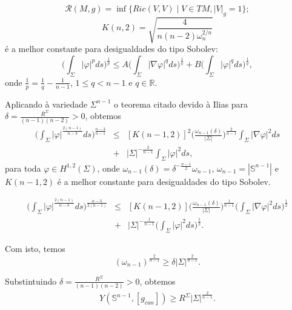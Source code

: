 \documentclass[blue]{beamer}
\begin{document}

\begin{frame}
\begin{block}{}
	$$	\label{infric}\mathcal{R}(M, g) = \inf\{Ric(V, V) \;|\; V\in TM, |V|_{g}=1\};$$
	$$K(n,2)= \sqrt{\frac{4}{n(n-2)\omega_{n}^{2/n}}}$$ é a melhor constante para desigualdades do tipo Sobolev:
	\begin{equation}\label{sob1}
	\Big(\int_{\Sigma} |\varphi|^{p} ds\Big)^{\frac{1}{p}}\leq A \Big(\int_{\Sigma}|\nabla \varphi|^{q} ds\Big)^{\frac{1}{q}} + B\Big(\int_{\Sigma} |\varphi|^{q} ds\Big)^{\frac{1}{q}},
	\end{equation}onde $\frac{1}{p}=\frac{1}{q}-\frac{1}{n-1}$, $1\leq q <n-1$ e $q\in\mathbb{R}.$
\end{block}
\end{frame}


\begin{frame}
Aplicando à variedade $\Sigma^{n-1}$ o teorema citado devido à Ilias para  $\delta = \frac{R^{\Sigma}}{(n-1)(n-2)}>0$, obtemos
\begin{eqnarray}
\nonumber\Big(\int_{\Sigma} |\varphi|^{\frac{2(n-1)}{n-3}} ds\Big)^{\frac{n-3}{n-1}}&\leq& [K(n-1,2)]^2 \Big(\frac{\omega_{n-1}(\delta)}{|\Sigma|}\Big)^{\frac{2}{n-1}} \int_{\Sigma}|\nabla \varphi|^2 ds \\
\nonumber &+& |\Sigma|^{-\frac{2}{n-1}}\int_{\Sigma} |\varphi|^2 ds,
\end{eqnarray} para toda $\varphi\in H^{1,2}(\Sigma)$, onde $\omega_{n-1}(\delta)=\delta^{-\frac{n-1}{2}}\omega_{n-1}$, $\omega_{n-1} = |\mathbb{S}^{n-1}|$ e $K(n-1,2)$ é a melhor constante para desigualdades do tipo Sobolev.
\end{frame}

\begin{frame}
\begin{eqnarray*}
	\Big(\int_{\Sigma} |\varphi|^{\frac{2(n-1)}{n-3}} ds\Big)^{\frac{n-3}{2(n-1)}}&\leq &[K(n-1,2)] \Big(\frac{\omega_{n-1}(\delta)}{|\Sigma|}\Big)^{\frac{1}{n-1}}\Big( \int_{\Sigma}|\nabla \varphi|^2 ds\Big)^{\frac{1}{2}}\\
	&+& |\Sigma|^{-\frac{1}{n-1}}\Big(\int_{\Sigma} |\varphi|^2 ds\Big)^{\frac{1}{2}}.
\end{eqnarray*}\pause

Com isto, temos
	\begin{equation*}\label{ineqwsigma}
(\omega_{n-1})^{\frac{2}{n-1}} \geq \delta |\Sigma|^{\frac{2}{n-1}}.
\end{equation*}\pause 

Substintuindo  $\delta = \frac{R^{\Sigma}}{(n-1)(n-2)}>0$, obtemos
\begin{eqnarray}\label{ineqYam}
Y(\mathbb{S}^{n-1}, [g_{can}]) \geq R^{\Sigma} |\Sigma|^{\frac{2}{n-1}}.
\end{eqnarray}
\end{frame}
\end{document}
